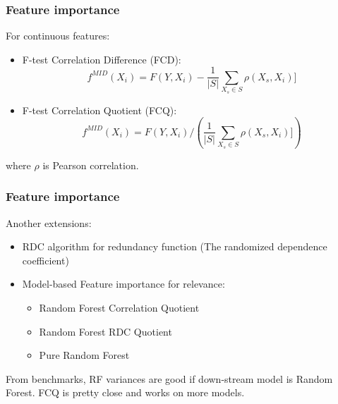 \documentclass{beamer}
\begin{document}
    \begin{frame}
        \frametitle{Feature importance}
        For continuous features:
        \begin{itemize}
            \item F-test Correlation Difference (FCD):
            \[
                f^{MID}(X_i) = F(Y, X_i) - \frac{1}{|S|} \sum_{X_s \in S} \rho (X_s, X_i)]
            \]
            \pause
            \item F-test Correlation Quotient (FCQ):
            \[
                f^{MID}(X_i) = F(Y, X_i) / \left( \frac{1}{|S|} \sum_{X_s \in S} \rho (X_s, X_i)] \right)
            \]
        \end{itemize}
        where $\rho$ is Pearson correlation.
    \end{frame}

    \begin{frame}
        \frametitle{Feature importance}
        Another extensions:
        \begin{itemize}
            \item RDC algorithm for redundancy function (The randomized dependence coefficient)
            \pause
            \item Model-based Feature importance for relevance:
                \begin{itemize}
                    \item Random Forest Correlation Quotient
                    \item Random Forest RDC Quotient
                    \item Pure Random Forest
                \end{itemize}
        \end{itemize}
        \pause
        From benchmarks, RF variances are good if down-stream model is Random Forest. FCQ is
        pretty close and works on more models.
    \end{frame}
\end{document}
